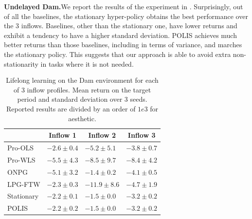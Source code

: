 \noindent\textbf{Undelayed Dam.}\indent We report the results of the experiment in . 
Surprisingly, out of all the baselines, the stationary hyper-policy obtains the best performance over the 3 inflows. 
Baselines, other than the stationary one, have lower returns and exhibit a tendency to have a higher standard deviation.
POLIS achieves much better returns than those baselines, including in terms of variance, and marches the stationary policy. 
This suggests that our approach is able to avoid extra non-stationarity in tasks where it is not needed. 

\begin{table}[t]
    \centering
    \begin{tabular}{l|lll}
          & \multicolumn{1}{c}{Inflow 1}       & \multicolumn{1}{c}{Inflow 2}        & \multicolumn{1}{c}{Inflow 3}       
        \\ \hline\hline
        Pro-OLS&$-2.6 \pm 0.4$&$-5.2 \pm 5.1$&$-3.8 \pm 0.7$\\
        Pro-WLS&$-5.5 \pm 4.3$&$-8.5 \pm 9.7$&$-8.4 \pm 4.2$\\
        ONPG&$-5.1 \pm 3.2$&$-1.4 \pm 0.2$&$-4.1 \pm 0.5$\\
        LPG-FTW&$-2.3 \pm 0.3$&$-11.9 \pm 8.6$&$-4.7 \pm 1.9$\\
        Stationary&$-2.2 \pm 0.1$&$-1.5 \pm 0.0$&$-3.2 \pm 0.2$\\
        POLIS&$-2.2 \pm 0.2$&$-1.5 \pm 0.0$&$-3.2 \pm 0.2$\\
    \end{tabular}
    \caption{Lifelong learning on the Dam environment for each of 3 inflow profiles. Mean return on the target period and standard deviation over 3 seeds. Reported results are divided by an order of $1e3$ for aesthetic.}\label{tab:exp_dam}
\end{table}






